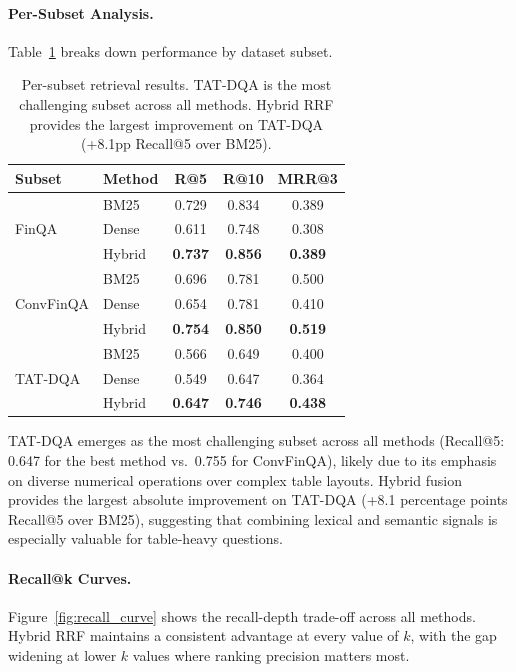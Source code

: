 \documentclass[11pt]{article}
\begin{document}
\paragraph{Per-Subset Analysis.}
Table~\ref{tab:subset_results} breaks down performance by dataset subset.

\begin{table}[t]
\centering
\small
\begin{tabular}{llccc}
\toprule
\textbf{Subset} & \textbf{Method} & \textbf{R@5} & \textbf{R@10} & \textbf{MRR@3} \\
\midrule
\multirow{3}{*}{FinQA}
  & BM25    & 0.729 & 0.834 & 0.389 \\
  & Dense   & 0.611 & 0.748 & 0.308 \\
  & Hybrid  & \textbf{0.737} & \textbf{0.856} & \textbf{0.389} \\
\midrule
\multirow{3}{*}{ConvFinQA}
  & BM25    & 0.696 & 0.781 & 0.500 \\
  & Dense   & 0.654 & 0.781 & 0.410 \\
  & Hybrid  & \textbf{0.754} & \textbf{0.850} & \textbf{0.519} \\
\midrule
\multirow{3}{*}{TAT-DQA}
  & BM25    & 0.566 & 0.649 & 0.400 \\
  & Dense   & 0.549 & 0.647 & 0.364 \\
  & Hybrid  & \textbf{0.647} & \textbf{0.746} & \textbf{0.438} \\
\bottomrule
\end{tabular}
\caption{Per-subset retrieval results. TAT-DQA is the most challenging subset across all methods. Hybrid RRF provides the largest improvement on TAT-DQA (+8.1pp Recall@5 over BM25).}
\label{tab:subset_results}
\end{table}

TAT-DQA emerges as the most challenging subset across all methods (Recall@5: 0.647 for the best method vs.\ 0.755 for ConvFinQA), likely due to its emphasis on diverse numerical operations over complex table layouts. Hybrid fusion provides the largest absolute improvement on TAT-DQA (+8.1 percentage points Recall@5 over BM25), suggesting that combining lexical and semantic signals is especially valuable for table-heavy questions.

\paragraph{Recall@k Curves.}
Figure~\ref{fig:recall_curve} shows the recall-depth trade-off across all methods. Hybrid RRF maintains a consistent advantage at every value of $k$, with the gap widening at lower $k$ values where ranking precision matters most.
\end{document}
